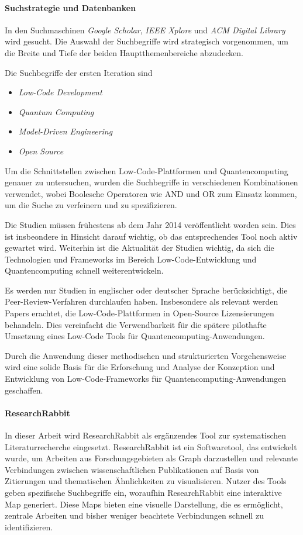 \paragraph{Suchstrategie und Datenbanken}
In den Suchmaschinen \textit{Google Scholar}, \textit{IEEE Xplore} und \textit{ACM Digital Library} 
wird gesucht. Die Auswahl der Suchbegriffe wird strategisch vorgenommen, um die Breite und Tiefe der beiden 
Hauptthemenbereiche abzudecken. 

Die Suchbegriffe der ersten Iteration sind
\begin{itemize}
    \item \textit{Low-Code Development} 
    \item \textit{Quantum Computing}
    \item \textit{Model-Driven Engineering}
    \item \textit{Open Source}
\end{itemize} 

Um die Schnittstellen zwischen Low-Code-Plattformen und Quantencomputing genauer zu untersuchen, 
wurden die Suchbegriffe in verschiedenen Kombinationen verwendet, wobei Boolesche Operatoren wie 
AND und OR zum Einsatz kommen, um die Suche zu verfeinern und zu spezifizieren.

Die Studien müssen frühestens ab dem Jahr 2014 veröffentlicht worden sein. Dies ist insbeondere in 
Hinsicht darauf wichtig, ob das entsprechendes Tool noch aktiv gewartet wird. 
Weiterhin ist die Aktualität der Studien wichtig, da sich die Technologien und Frameworks 
im Bereich Low-Code-Entwicklung und Quantencomputing schnell weiterentwickeln.

Es werden nur Studien in englischer oder deutscher Sprache berücksichtigt, die Peer-Review-Verfahren 
durchlaufen haben. Insbesondere als relevant werden Papers erachtet, die Low-Code-Plattformen 
in Open-Source Lizensierungen behandeln. Dies vereinfacht die Verwendbarkeit für 
die spätere pilothafte Umsetzung eines Low-Code Tools für Quantencomputing-Anwendungen.

Durch die Anwendung dieser 
methodischen und strukturierten Vorgehensweise wird eine solide Basis für die Erforschung 
und Analyse der Konzeption und Entwicklung von Low-Code-Frameworks für 
Quantencomputing-Anwendungen geschaffen.

\paragraph{ResearchRabbit}
In dieser Arbeit wird ResearchRabbit als ergänzendes Tool zur systematischen Literaturrecherche eingesetzt. 
ResearchRabbit ist ein Softwaretool, das entwickelt wurde, um Arbeiten aus Forschungsgebieten als Graph darzustellen 
und relevante Verbindungen zwischen wissenschaftlichen Publikationen auf Basis von Zitierungen und thematischen 
Ähnlichkeiten zu visualisieren.\cite{cole2023researchrabbit} Nutzer des Tools geben spezifische Suchbegriffe ein, woraufhin ResearchRabbit eine 
interaktive Map generiert. Diese Maps bieten eine visuelle Darstellung, die es ermöglicht, 
zentrale Arbeiten und bisher weniger beachtete Verbindungen schnell zu identifizieren.

